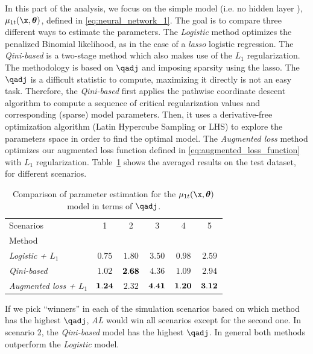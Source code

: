 In this part of the analysis, we focus on the simple model (i.e. no hidden layer {}), $\mu_{1t}(\x, \boldsymbol{\theta})$, defined in \eqref{eq:neural_network_1}. The goal is to compare three different ways to estimate the parameters. The {\it Logistic} method optimizes the penalized Binomial likelihood, as in the case of a {\it lasso} logistic regression. The {\it Qini-based} is a two-stage method which also makes use of the $L_1$ regularization. The methodology is based on $\qadj$ and imposing sparsity using the lasso. The $\qadj$ is a difficult statistic to compute, maximizing it directly is not an easy task. Therefore, the {\it Qini-based} first applies the pathwise coordinate descent algorithm \citep{friedman2007pathwise} to compute a sequence of critical regularization values and corresponding (sparse) model parameters. Then, it uses a derivative-free optimization algorithm (Latin Hypercube Sampling or LHS) to explore the parameters space in order to find the optimal model. The {\it Augmented loss} method optimizes our augmented loss function defined in \eqref{eq:augmented_loss_function} with $L_1$ regularization. Table~\ref{tab:param_estimation_results} shows the averaged results on the test dataset, for different scenarios. 

\begin{table}[!ht]
    \centering
    \caption{Comparison of parameter estimation for the $\mu_{1t}(\x, \boldsymbol{\theta})$ model in terms of $\qadj$.}
    \label{tab:param_estimation_results}
    \begin{tabular}{l|ccccc}
        Scenarios & 1 & 2 & 3 & 4 & 5\\
        Method & & & & & \\
        \hline
        {\it Logistic + $L_1$} & $0.75$ & $1.80$  & $3.50$ & $0.98$ & $2.59$\\
        {\it Qini-based} & $1.02$ & $\bf2.68$ & $4.36$ & $1.09$ & $2.94$\\
        {\it Augmented loss + $L_1$} & $\bf1.24$  & $2.32$ & $\bf4.41$ & $\bf1.20$ & $\bf3.12$\\
        \hline
    \end{tabular}
\end{table}


If we pick “winners” in each of the simulation scenarios based on which
method has the highest $\qadj$, {\it AL} would win all scenarios except for the second one. In scenario 2, the {\it Qini-based} model has the highest $\qadj$. In general both methods outperform the {\it Logistic} model.

